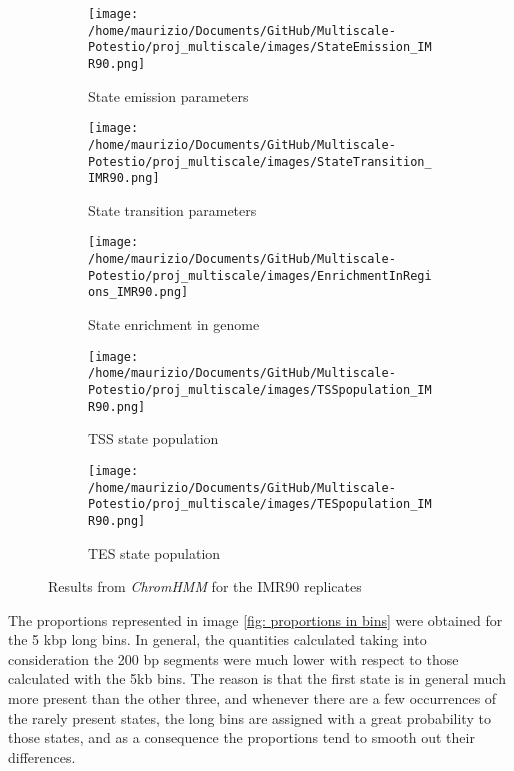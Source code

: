 \begin{figure}[H]
    \centering
    \begin{subfigure}[t]{0.065\textwidth}
      \texttt{[image: /home/maurizio/Documents/GitHub/Multiscale-Potestio/proj\_multiscale/images/StateEmission\_IMR90.png]}
      \caption{State emission parameters}
      \label{fig:State emission parameters}
  \end{subfigure}
  \begin{subfigure}[t]{0.11\textwidth}
      \texttt{[image: /home/maurizio/Documents/GitHub/Multiscale-Potestio/proj\_multiscale/images/StateTransition\_IMR90.png]}
      \caption{State transition parameters}
      \label{fig:State transition parameters}
  \end{subfigure}
  \begin{subfigure}[t]{0.15\textwidth}
      \texttt{[image: /home/maurizio/Documents/GitHub/Multiscale-Potestio/proj\_multiscale/images/EnrichmentInRegions\_IMR90.png]}
      \caption{State enrichment in genome}
      \label{fig:State enrichment in genome}
  \end{subfigure}
    \hspace{0.6\textwidth}
    \begin{subfigure}{0.39\textwidth}
      \texttt{[image: /home/maurizio/Documents/GitHub/Multiscale-Potestio/proj\_multiscale/images/TSSpopulation\_IMR90.png]}
      \caption{TSS state population}
      \label{fig:TSS state population}
    \end{subfigure}
    \begin{subfigure}{0.39\textwidth}
      \texttt{[image: /home/maurizio/Documents/GitHub/Multiscale-Potestio/proj\_multiscale/images/TESpopulation\_IMR90.png]}
      \caption{TES state population}
      \label{fig:TES state population}
    \end{subfigure}
  
    \caption{Results from \textit{ChromHMM} for the IMR90 replicates}
    \label{fig:ChromHMM results}
\end{figure}


The proportions represented in image \ref{fig: proportions in bins} were obtained for the 5 kbp long bins. In general, the quantities calculated taking into consideration the 200 bp segments were much lower with respect to those calculated with the 5kb bins. The reason is that the first state is in general much more present than the other three, and whenever there are a few occurrences of the rarely present states, the long bins are assigned with a great probability to those states, and as a consequence the proportions tend to smooth out their differences.

